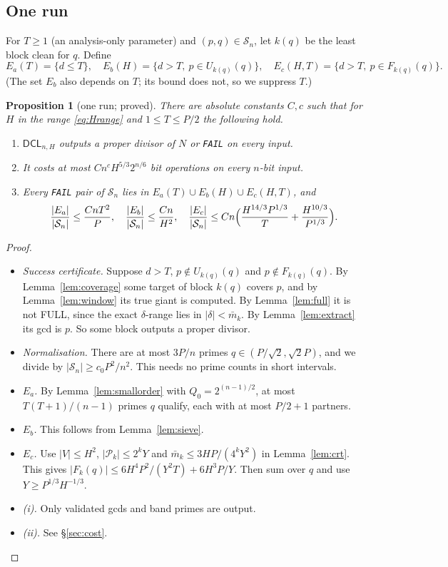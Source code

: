 \documentclass[11pt]{amsart}
\newtheorem{proposition}[theorem]{Proposition}
\theoremstyle{definition}
\newcommand{\Sn}{\mathcal{S}_n}
\newcommand{\Pk}{\mathcal{P}_k}
\newcommand{\mbar}{\bar m_k}
\newcommand{\DCL}{\textsf{DCL}}
\begin{document}
\subsection{One run}
For $T\ge1$ (an analysis-only parameter) and $(p,q)\in\Sn$, let $k(q)$ be the least block clean
for $q$. Define
\[
  E_a(T)=\{d\le T\},\quad E_b(H)=\{d>T,\ p\in U_{k(q)}(q)\},\quad
  E_c(H,T)=\{d>T,\ p\in F_{k(q)}(q)\}.
\]
(The set $E_b$ also depends on $T$; its bound does not, so we suppress $T$.)

\begin{proposition}[one run; proved]\label{prop:onerun}
There are absolute constants $C,c$ such that for $H$ in the range \eqref{eq:Hrange} and
$1\le T\le P/2$ the following hold.
\begin{enumerate}[label=(\roman*)]
\item $\DCL_{n,H}$ outputs a proper divisor of $N$ or \texttt{FAIL} on every input.
\item It costs at most $Cn^cH^{5/3}2^{n/6}$ bit operations on every $n$-bit input.
\item Every \texttt{FAIL} pair of $\Sn$ lies in $E_a(T)\cup E_b(H)\cup E_c(H,T)$, and
  \[
  \frac{|E_a|}{|\Sn|}\le\frac{CnT^2}{P},\quad \frac{|E_b|}{|\Sn|}\le\frac{Cn}{H^2},\quad
  \frac{|E_c|}{|\Sn|}\le Cn\Bigl(\frac{H^{14/3}P^{1/3}}{T}+\frac{H^{10/3}}{P^{1/3}}\Bigr).
  \]
\end{enumerate}
\end{proposition}
\begin{proof}
\begin{itemize}
\item \emph{Success certificate.} Suppose $d>T$, $p\notin U_{k(q)}(q)$ and
  $p\notin F_{k(q)}(q)$. By Lemma~\ref{lem:coverage} some target of block $k(q)$ covers $p$, and
  by Lemma~\ref{lem:window} its true giant is computed. By Lemma~\ref{lem:full} it is not FULL,
  since the exact $\delta$-range lies in $|\delta|<\mbar$. By Lemma~\ref{lem:extract} its gcd is
  $p$. So some block outputs a proper divisor.
\item \emph{Normalisation.} There are at most $3P/n$ primes $q\in(P/\sqrt2,\sqrt2P)$, and we
  divide by $|\Sn|\ge c_0P^2/n^2$. This needs no prime counts in short intervals.
\item \emph{$E_a$.} By Lemma~\ref{lem:smallorder} with $Q_0=2^{(n-1)/2}$, at most
  $T(T+1)/(n-1)$ primes $q$ qualify, each with at most $P/2+1$ partners.
\item \emph{$E_b$.} This follows from Lemma~\ref{lem:sieve}.
\item \emph{$E_c$.} Use $|V|\le H^2$, $|\Pk|\le2^kY$ and $\mbar\le3HP/(4^kY^2)$ in
  Lemma~\ref{lem:crt}. This gives $|F_k(q)|\le6H^4P^2/(Y^2T)+6H^3P/Y$. Then sum over $q$ and use
  $Y\ge P^{1/3}H^{-1/3}$.
\item \emph{(i).} Only validated gcds and band primes are output.
\item \emph{(ii).} See \S\ref{sec:cost}.
\end{itemize}
\end{proof}
\end{document}
